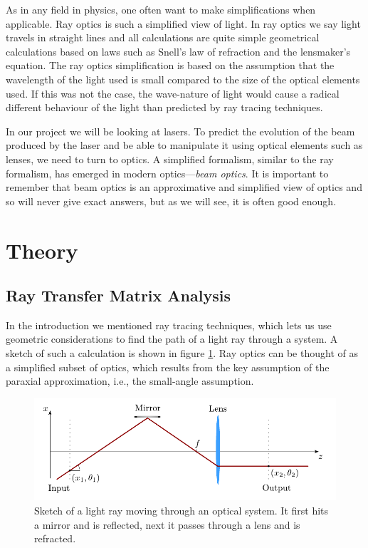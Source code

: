 \documentclass[a4paper, 11pt, notitlepage, english]{article}
\begin{document}
As in any field in physics, one often want to make simplifications when applicable. Ray optics is such a simplified view of light. In ray optics we say light travels in straight lines and all calculations are quite simple geometrical calculations based on laws such as Snell's law of refraction and the lensmaker's equation. The ray optics simplification is based on the assumption that the wavelength of the light used is small compared to the size of the optical elements used. If this was not the case, the wave-nature of light would cause a radical different behaviour of the light than predicted by ray tracing techniques.

In our project we will be looking at lasers. To predict the evolution of the beam produced by the laser and be able to manipulate it using optical elements such as lenses, we need to turn to optics. A simplified formalism, similar to the ray formalism, has emerged in modern optics---\emph{beam optics}. It is important to remember that beam optics is an approximative and simplified view of optics and so will never give exact answers, but as we will see, it is often good enough. 


\clearpage

\section{Theory}

\subsection{Ray Transfer Matrix Analysis}

In the introduction we mentioned ray tracing techniques, which lets us use geometric considerations to find the path of a light ray through a system. A sketch of such a calculation is shown in figure \ref{fig:RTMA}. Ray optics can be thought of as a simplified subset of optics, which results from the key assumption of the paraxial approximation, i.e., the small-angle assumption.

\begin{figure}[htpb]
\centering
\includegraphics[width=\textwidth]{RTM.pdf}	
\caption{Sketch of a light ray moving through an optical system. It first hits a mirror and is reflected, next it passes through a lens and is refracted. \label{fig:RTMA}}
\end{figure}
\end{document}
